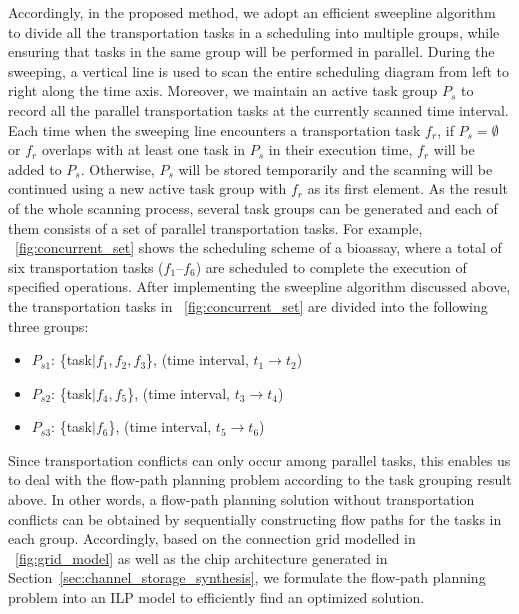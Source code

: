 Accordingly, in the proposed method, we adopt an efficient sweepline algorithm \cite{lane1979generalized} to divide all the transportation tasks in a scheduling into multiple groups, while ensuring that tasks in the same group will be performed in parallel. During the sweeping, a vertical line is used to scan the entire scheduling diagram from left to right along the time axis. Moreover, we maintain an active task group $P_{s}$ to record all the parallel transportation tasks at the currently scanned time interval. Each time when the sweeping line encounters a transportation task $f_r$, if $P_s=\emptyset$ or $f_r$ overlaps with at least one task in $P_s$ in their execution time, $f_r$ will be added to $P_s$. Otherwise, $P_s$ will be stored temporarily and the scanning will be continued using a new active task group with $f_r$ as its first element. As the result of the whole scanning process, several task groups can be generated and each of them consists of a set of parallel transportation tasks. For example, \figname~\ref{fig:concurrent_set} shows the scheduling scheme of a bioassay, where a total of six transportation tasks ($f_1$--$f_6$) are scheduled to complete the execution of specified operations. After implementing the sweepline algorithm discussed above, the transportation tasks in \figname~\ref{fig:concurrent_set} are divided into the following three groups:

\begin{itemize}
\item
$P_{s1}$: \{task$|f_1,f_2,f_3$\}, (time interval, $t_1\to t_2$)
\item
$P_{s2}$: \{task$|f_4,f_5$\}, (time interval, $t_3\to t_4$)
\item
$P_{s3}$: \{task$|f_6$\}, (time interval, $t_5\to t_6$)
\end{itemize}

Since transportation conflicts can only occur among parallel tasks, this enables us to deal with the flow-path planning problem according to the task grouping result above. In other words, a flow-path planning solution without transportation conflicts can be obtained by sequentially constructing flow paths for the tasks in each group. Accordingly, based on the connection grid modelled in \figname~\ref{fig:grid_model} as well as the chip architecture generated in Section~\ref{sec:channel_storage_synthesis}, we formulate the flow-path planning problem into an ILP model to efficiently find an optimized solution.

